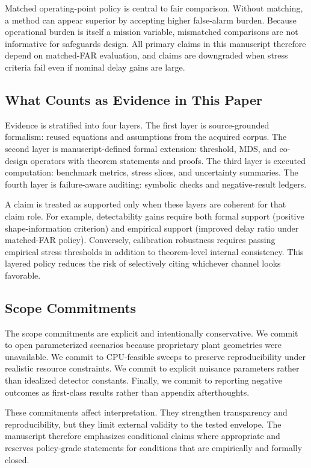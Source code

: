 Matched operating-point policy is central to fair comparison. Without matching, a method can appear superior by accepting higher false-alarm burden. Because operational burden is itself a mission variable, mismatched comparisons are not informative for safeguards design. All primary claims in this manuscript therefore depend on matched-FAR evaluation, and claims are downgraded when stress criteria fail even if nominal delay gains are large.

\subsection{What Counts as Evidence in This Paper}
Evidence is stratified into four layers. The first layer is source-grounded formalism: reused equations and assumptions from the acquired corpus. The second layer is manuscript-defined formal extension: threshold, MDS, and co-design operators with theorem statements and proofs. The third layer is executed computation: benchmark metrics, stress slices, and uncertainty summaries. The fourth layer is failure-aware auditing: symbolic checks and negative-result ledgers.

A claim is treated as supported only when these layers are coherent for that claim role. For example, detectability gains require both formal support (positive shape-information criterion) and empirical support (improved delay ratio under matched-FAR policy). Conversely, calibration robustness requires passing empirical stress thresholds in addition to theorem-level internal consistency. This layered policy reduces the risk of selectively citing whichever channel looks favorable.

\subsection{Scope Commitments}
The scope commitments are explicit and intentionally conservative. We commit to open parameterized scenarios because proprietary plant geometries were unavailable. We commit to CPU-feasible sweeps to preserve reproducibility under realistic resource constraints. We commit to explicit nuisance parameters rather than idealized detector constants. Finally, we commit to reporting negative outcomes as first-class results rather than appendix afterthoughts.

These commitments affect interpretation. They strengthen transparency and reproducibility, but they limit external validity to the tested envelope. The manuscript therefore emphasizes conditional claims where appropriate and reserves policy-grade statements for conditions that are empirically and formally closed.

